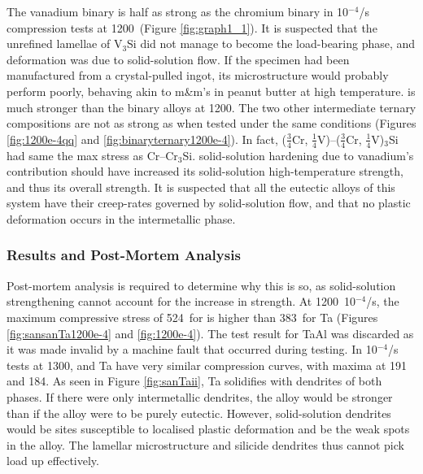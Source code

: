The vanadium binary is half as strong as the chromium binary in 10$^{-4}$/s compression tests at 1200\celsius\ (Figure \ref{fig:graph1_1}).  It is suspected that the unrefined lamellae of V$_3$Si did not manage to become the load-bearing phase, and deformation was due to solid-solution flow. If the specimen had been manufactured from a crystal-pulled ingot, its microstructure would probably perform poorly, behaving akin to m\&m's in peanut butter at high temperature.   is much stronger than the binary alloys at 1200\celsius.  The two other intermediate ternary compositions  are not as strong as  when tested under the same conditions (Figures \ref{fig:1200e-4qq} and \ref{fig:binaryternary1200e-4}).  In fact, ($\frac{3}{4}$Cr, $\frac{1}{4}$V)--($\frac{3}{4}$Cr, $\frac{1}{4}$V)$_3$Si had same the max stress as Cr--Cr$_3$Si. solid-solution hardening due to vanadium's contribution should have increased its solid-solution high-temperature strength, and thus its overall strength.  It is suspected that all the eutectic alloys of this system have their creep-rates governed by solid-solution flow, and that no plastic deformation occurs in the intermetallic phase.



\subsubsection{Results and Post-Mortem Analysis}

Post-mortem analysis is required to determine why this is so, as solid-solution strengthening cannot account for the increase in strength.  At 1200\celsius\ 10$^{-4}$/s, the maximum compressive stress of 524\mega\pascal\ for  is higher than 383\mega\pascal\ for Ta (Figures \ref{fig:sansanTa1200e-4} and \ref{fig:1200e-4}).  The test result for TaAl was discarded as it was made invalid by a machine fault that occurred during testing.  In 10$^{-4}$/s tests at 1300\celsius,  and Ta have very similar compression curves, with maxima at 191 and 184\mega\pascal.  As seen in Figure \ref{fig:sanTaii}, Ta solidifies with dendrites of both phases.  If there were only intermetallic dendrites, the alloy would be stronger than if the alloy were to be purely eutectic.  However, solid-solution dendrites would be sites susceptible to localised plastic deformation and be the weak spots in the alloy.  The lamellar microstructure and silicide dendrites thus cannot pick load up effectively.

